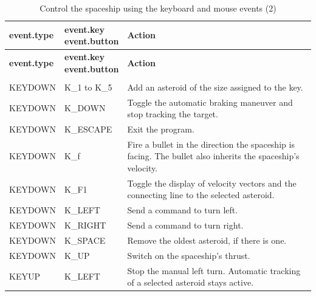 \begin{longtable}{>{\ttfamily}l>{\ttfamily}lp{8.5cm}}
	\caption{Control the spaceship using the keyboard and mouse events (2)}
	\label{tabAsteroidsEvents2}\\
	\toprule
	\textbf{event.type} &
	\shortstack[l]{\textbf{event.key}\\
		\textbf{event.button}} &
	\textbf{Action} \\
	\midrule
	\endfirsthead
	
	\toprule
	\textbf{event.type} &
	\shortstack[l]{\textbf{event.key}\\
		\textbf{event.button}} &
	\textbf{Action} \\
	\midrule
	\endhead
	
	\midrule
	\multicolumn{3}{r}{\emph{Continued on the next page}} \\
	\endfoot
	
	\bottomrule
	\endlastfoot
	
	KEYDOWN & K\_1 to K\_5 &
	Add an asteroid of the size assigned to the key. \\
	
	KEYDOWN & K\_DOWN &
	Toggle the automatic braking maneuver
	and stop tracking the target. \\
	
	KEYDOWN & K\_ESCAPE &
	Exit the program. \\
	
	KEYDOWN & K\_f &
	Fire a bullet in the direction the spaceship is facing.
	The bullet also inherits the spaceship's velocity. \\
	
	KEYDOWN & K\_F1 &
	Toggle the display of velocity vectors and the
	connecting line to the selected asteroid. \\
	
	KEYDOWN & K\_LEFT &
	Send a command to turn left. \\
	
	KEYDOWN & K\_RIGHT &
	Send a command to turn right. \\
	
	KEYDOWN & K\_SPACE &
	Remove the oldest asteroid,
	if there is one. \\
	
	KEYDOWN & K\_UP &
	Switch on the spaceship's thrust. \\
	
	KEYUP & K\_LEFT &
	Stop the manual left turn. Automatic
	tracking of a selected asteroid stays active. \\
	

\end{longtable}
